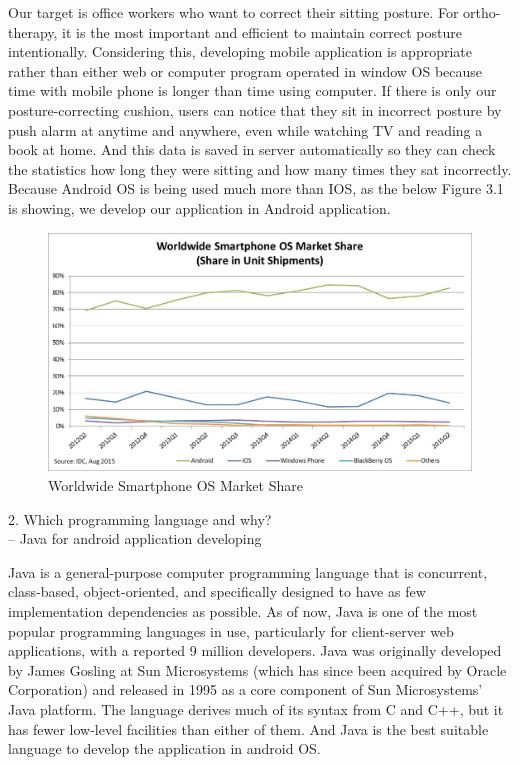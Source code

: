 \documentclass[conference]{IEEEtran}
\begin{document}
Our target is office workers who want to correct their sitting posture. For ortho-therapy, it is the most important and efficient to maintain correct posture intentionally. Considering this, developing mobile application is appropriate rather than either web or computer program operated in window OS because time with mobile phone is longer than time using computer. If there is only our posture-correcting cushion, users can notice that they sit in incorrect posture by push alarm at anytime and anywhere, even while watching TV and reading a book at home. And this data is saved in server automatically so they can check the statistics how long they were sitting and how many times they sat incorrectly. Because Android OS is being used much more than IOS, as the below Figure 3.1 is showing, we develop our application in Android application.

\begin{figure}[htbp]
\begin{center}
    \includegraphics[scale=0.4]{img_03.png}
    \caption{Worldwide Smartphone OS Market Share} 
\end{center}
\end{figure}

2.	Which programming language and why?\\

-- Java for android application developing

Java is a general-purpose computer programming language that is concurrent, class-based, object-oriented, and specifically designed to have as few implementation dependencies as possible. As of now, Java is one of the most popular programming languages in use, particularly for client-server web applications, with a reported 9 million developers. Java was originally developed by James Gosling at Sun Microsystems (which has since been acquired by Oracle Corporation) and released in 1995 as a core component of Sun Microsystems' Java platform. The language derives much of its syntax from C and C++, but it has fewer low-level facilities than either of them. And Java is the best suitable language to develop the application in android OS.\\
\end{document}

